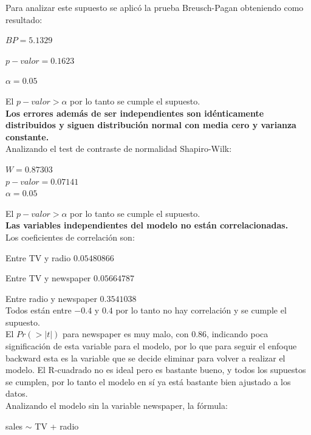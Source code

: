 \documentclass[12pt,a4paper]{article}
\begin{document}
	Para analizar este supuesto se aplicó la prueba Breusch-Pagan obteniendo como resultado:
	
	\begin{center}
		$BP = 5.1329$
		
		$p-valor = 0.1623$
		
		$\alpha = 0.05$
	\end{center}

	El $p-valor > \alpha$ por lo tanto se cumple el supuesto.\\
	
	\textbf{Los errores además de ser independientes son idénticamente distribuidos y siguen distribución normal con media cero y varianza constante.}\\
	Analizando el test de contraste de normalidad Shapiro-Wilk:
	\begin{center}
		$W = 0.87303$ \\
		$p-valor = 0.07141$\\
		$\alpha = 0.05$
	\end{center}

	El $p-valor > \alpha$ por lo tanto se cumple el supuesto.\\
	
	\textbf{Las variables independientes del modelo no están correlacionadas.}\\
	
	
	Los coeficientes de correlación son:
	
	Entre TV y radio $0.05480866$
	
	Entre TV y newspaper $0.05664787$
	
	Entre radio y newspaper $0.3541038$\\
	
	Todos están entre $-0.4$ y $0.4$ por lo tanto no hay correlación y se cumple el supuesto.\\
	
	El $Pr(>|t|)$ para newspaper es muy malo, con 0.86, indicando poca significación de esta variable para el modelo, por lo que para seguir el enfoque backward esta es la variable que se decide eliminar para volver a realizar el modelo. El R-cuadrado no es ideal pero es bastante bueno, y todos los supuestos se cumplen, por lo tanto el modelo en sí ya está bastante bien ajustado a los datos.\\
	
	Analizando el modelo sin la variable newspaper, la fórmula:
	\begin{center}
		sales $\sim$ TV + radio 
	\end{center}
	
\end{document}
